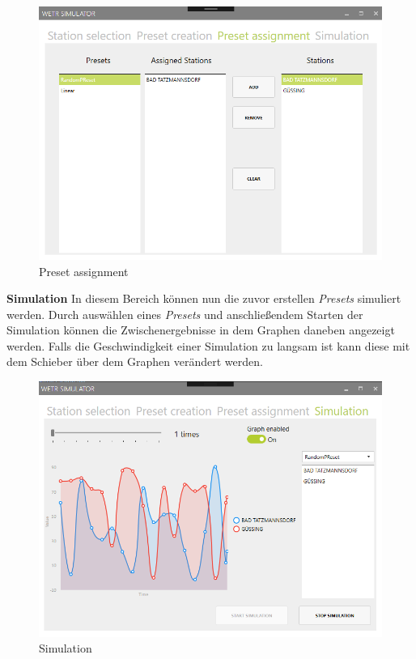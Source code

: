 \begin{figure}[H]
\centering
\includegraphics[width=.6\textwidth]{pictures/Simulator/Simulator_3_PresetAssignment.png}
\caption{Preset assignment}
\label{fig:Wetr.Simulator.Wpf.PresetAssignment}
\end{figure}
\raggedright

\textbf{Simulation}\newline
In diesem Bereich können nun die zuvor erstellen \textit{Presets} simuliert werden. Durch auswählen eines \textit{Presets} und anschließendem Starten der Simulation können die Zwischenergebnisse in dem Graphen daneben angezeigt werden. 
Falls die Geschwindigkeit einer Simulation zu langsam ist kann diese mit dem Schieber über dem Graphen verändert werden.

\begin{figure}[H]
\centering
\includegraphics[width=.6\textwidth]{pictures/Simulator/Simulator_4_Simulation.png}
\caption{Simulation}
\label{fig:Wetr.Simulator.Wpf.Simulation}
\end{figure}
\raggedright